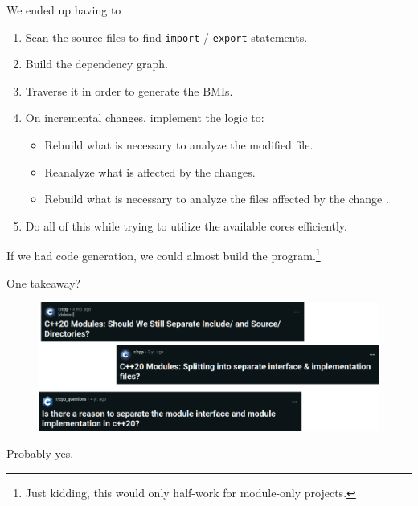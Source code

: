 \documentclass[aspectratio=169]{beamer}
\begin{document}
\begin{frame}{We ended up having to}
  \begin{enumerate}
    \item Scan the source files to find \texttt{import} / \texttt{export} statements.
    \item Build the dependency graph.
    \item Traverse it in order to generate the BMIs.
    \item On incremental changes, implement the logic to:
          \begin{itemize}
            \item Rebuild what is necessary to analyze the modified file.
            \item Reanalyze what is affected by the changes.
            \item Rebuild what is necessary to analyze the files affected by the change .
          \end{itemize}
    \item Do all of this while trying to utilize the available cores efficiently.
  \end{enumerate}
  If we had code generation, we could almost build the program.\footnote{\tiny Just kidding, this would only half-work for module-only projects.}
\end{frame}

\begin{frame}{One takeaway?}
  \begin{figure}
    \includegraphics[width=0.5\linewidth]{questions.png}
  \end{figure}
  \centering
  Probably yes.
\end{frame}
\end{document}
